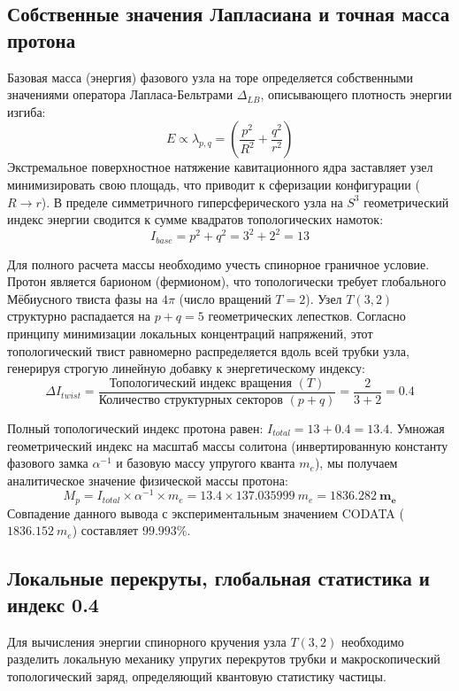 \documentclass[12pt,a4paper]{article}
\begin{document}
	\subsection{Собственные значения Лапласиана и точная масса протона}
	Базовая масса (энергия) фазового узла на торе определяется собственными значениями оператора Лапласа-Бельтрами $\Delta_{LB}$, описывающего плотность энергии изгиба:
	\begin{equation}
		E \propto \lambda_{p,q} = \left( \frac{p^2}{R^2} + \frac{q^2}{r^2} \right)
	\end{equation}
	Экстремальное поверхностное натяжение кавитационного ядра заставляет узел минимизировать свою площадь, что приводит к сферизации конфигурации ($R \to r$). В пределе симметричного гиперсферического узла на $S^3$ геометрический индекс энергии сводится к сумме квадратов топологических намоток: 
	\begin{equation}
		I_{base} = p^2 + q^2 = 3^2 + 2^2 = 13
	\end{equation}
	
	Для полного расчета массы необходимо учесть спинорное граничное условие. Протон является барионом (фермионом), что топологически требует глобального Мёбиусного твиста фазы на $4\pi$ (число вращений $T=2$). Узел $T(3,2)$ структурно распадается на $p+q = 5$ геометрических лепестков. Согласно принципу минимизации локальных концентраций напряжений, этот топологический твист равномерно распределяется вдоль всей трубки узла, генерируя строгую линейную добавку к энергетическому индексу:
	\begin{equation}
		\Delta I_{twist} = \frac{\text{Топологический индекс вращения } (T)}{\text{Количество структурных секторов } (p+q)} = \frac{2}{3+2} = \mathbf{0.4}
	\end{equation}
	
	Полный топологический индекс протона равен: $I_{total} = 13 + 0.4 = 13.4$.
	Умножая геометрический индекс на масштаб массы солитона (инвертированную константу фазового замка $\alpha^{-1}$ и базовую массу упругого кванта $m_e$), мы получаем аналитическое значение физической массы протона:
	\begin{equation}
		M_p = I_{total} \times \alpha^{-1} \times m_e = 13.4 \times 137.035999 \ m_e = \mathbf{1836.282 \ m_e}
	\end{equation}
	Совпадение данного вывода с экспериментальным значением CODATA ($1836.152 \ m_e$) составляет $99.993\%$.
	
	\subsection{Локальные перекруты, глобальная статистика и индекс 0.4}
	Для вычисления энергии спинорного кручения узла $T(3,2)$ необходимо разделить локальную механику упругих перекрутов трубки и макроскопический топологический заряд, определяющий квантовую статистику частицы.
	
\end{document}

